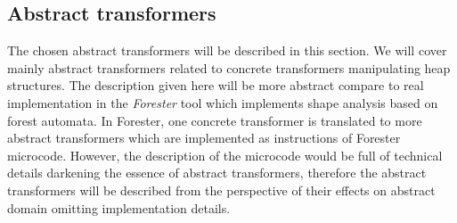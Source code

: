 \documentclass[a4paper, 12pt]{article}
\begin{document}
\subsection{Abstract transformers}
The chosen abstract transformers will be described in this section.
We will cover mainly abstract transformers related to concrete transformers
manipulating heap structures.
The description given here will be more abstract compare to real implementation
in the \emph{Forester} tool \cite{www:forester} which implements shape analysis
based on forest automata.
In Forester, one concrete transformer is translated to more abstract transformers
which are implemented as instructions of Forester microcode.
However, the description of the microcode would be full of technical details
darkening the essence of abstract transformers, therefore the abstract transformers
will be described from the perspective of their effects on abstract domain
omitting implementation details.
\end{document}
